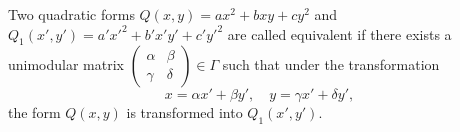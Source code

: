 Two quadratic forms $Q(x, y) = ax^2 + bxy + cy^2$ and $Q_1(x', y') = a'x'^2 + b'x'y' + c'y'^2$ are called equivalent if there exists a unimodular matrix $\begin{pmatrix} \alpha & \beta \\ \gamma & \delta \end{pmatrix} \in \Gamma$ such that under the transformation
$$x = \alpha x' + \beta y', \quad y = \gamma x' + \delta y',$$
the form $Q(x, y)$ is transformed into $Q_1(x', y')$.
